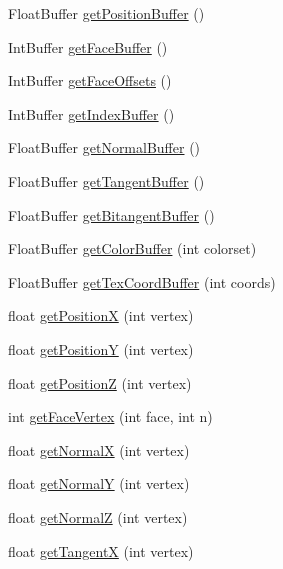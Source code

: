 \begin{DoxyCompactItemize}
\item 
Float\+Buffer \hyperlink{classjassimp_1_1_ai_mesh_a83f58aa04c0a878dab0ce8042ca6e88f}{get\+Position\+Buffer} ()
\item 
Int\+Buffer \hyperlink{classjassimp_1_1_ai_mesh_a5ba3c8bda2044dd506efd8cf09c752ea}{get\+Face\+Buffer} ()
\item 
Int\+Buffer \hyperlink{classjassimp_1_1_ai_mesh_aa0a2c72766f1a1ea419eee08899c91e4}{get\+Face\+Offsets} ()
\item 
Int\+Buffer \hyperlink{classjassimp_1_1_ai_mesh_a7119ac40da1cc6f54dda89f59424e746}{get\+Index\+Buffer} ()
\item 
Float\+Buffer \hyperlink{classjassimp_1_1_ai_mesh_a5b4e5815633f8e073c4744ddd0847d5f}{get\+Normal\+Buffer} ()
\item 
Float\+Buffer \hyperlink{classjassimp_1_1_ai_mesh_ac2e360087b8608fbfa187ac0dcdd8bf8}{get\+Tangent\+Buffer} ()
\item 
Float\+Buffer \hyperlink{classjassimp_1_1_ai_mesh_aa085be4da7c45c89b3e2c34e41de4747}{get\+Bitangent\+Buffer} ()
\item 
Float\+Buffer \hyperlink{classjassimp_1_1_ai_mesh_aaf44d649f02ddd624d7b8088624f77c0}{get\+Color\+Buffer} (int colorset)
\item 
Float\+Buffer \hyperlink{classjassimp_1_1_ai_mesh_a641c84ab7e897e0ff3236a6dfcdca30a}{get\+Tex\+Coord\+Buffer} (int coords)
\item 
float \hyperlink{classjassimp_1_1_ai_mesh_a78be92f6812e8988472254a792a2343e}{get\+Position\+X} (int vertex)
\item 
float \hyperlink{classjassimp_1_1_ai_mesh_a6858d7a63959e5ac878f95ab0c1acfbd}{get\+Position\+Y} (int vertex)
\item 
float \hyperlink{classjassimp_1_1_ai_mesh_a2fa1765ee16e16836f0b05afb6279d4d}{get\+Position\+Z} (int vertex)
\item 
int \hyperlink{classjassimp_1_1_ai_mesh_a95a58d261841def7da3d2546aa623d8d}{get\+Face\+Vertex} (int face, int n)
\item 
float \hyperlink{classjassimp_1_1_ai_mesh_ae09ed8e8022a74f9d4706e94d343493e}{get\+Normal\+X} (int vertex)
\item 
float \hyperlink{classjassimp_1_1_ai_mesh_a3ee594db051b13a990092bb849fba3ba}{get\+Normal\+Y} (int vertex)
\item 
float \hyperlink{classjassimp_1_1_ai_mesh_a7c092b3ffd649987ef83a4550a7926f7}{get\+Normal\+Z} (int vertex)
\item 
float \hyperlink{classjassimp_1_1_ai_mesh_a6b925f191009563fab1481c3084be4e1}{get\+Tangent\+X} (int vertex)

\end{DoxyCompactItemize}
